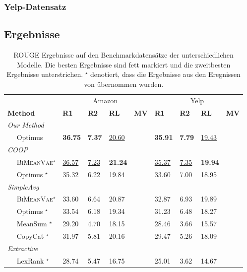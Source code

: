 \subsubsection{Yelp-Datensatz}

\subsection{Ergebnisse}

\begin{table}[!h]
    \label{eval_results}
    \centering
    \begin{tabular}{@{}lllllllll@{}}
    \toprule
                               & \multicolumn{4}{c}{Amazon} & \multicolumn{4}{c}{Yelp} \\ 
    \textbf{Method} & \textbf{R1} & \textbf{R2} & \textbf{RL} & \textbf{MV} & \textbf{R1} & \textbf{R2} & \textbf{RL} & \textbf{MV}\\ \midrule
    \textit{Our Method}        &         &         &        &        &        &   & &     \\
    $\quad$ Optimus            &     \textbf{36.75}    &   \textbf{7.37}      &     \underline{20.60}  & &   \textbf{35.91}   &   \textbf{7.79}       & \underline{19.43}   &    \\ \midrule
    \textit{COOP}              &         &         &        &        &        & &   &    \\
    $\quad$ \textsc{BiMeanVae}$^{\star}$ & \underline{36.57}    & \underline{7.23}   & \textbf{21.24} & & \underline{35.37}  & \underline{7.35}  & \textbf{19.94} & \\
    $\quad$ Optimus $^{\star}$           & 35.32   & 6.22    & 19.84 & & 33.60  & 7.00   & 18.95 & \\ \midrule
    \textit{SimpleAvg}         &         &         &        &      &  &        &        \\
    $\quad$ \textsc{BiMeanVae}$^{\star}$ & 33.60   & 6.64    & 20.87 & & 32.87  & 6.93   & 19.89 & \\
    $\quad$ Optimus  $^{\star}$          & 33.54   & 6.18    & 19.34 & & 31.23  & 6.48   & 18.27 & \\
    $\quad$ MeanSum  $^{\star}$          & 29.20   & 4.70    & 18.15 & & 28.46  & 3.66   & 15.57 & \\
    $\quad$ CopyCat  $^{\star}$          & 31.97   & 5.81    & 20.16 & & 29.47  & 5.26   & 18.09 & \\ \midrule
    \textit{Extractive}        &         &         &        &      &  &        &  &      \\
    $\quad$ LexRank  $^{\star}$          & 28.74   & 5.47    & 16.75 & & 25.01  & 3.62   & 14.67 & \\ \bottomrule
    \end{tabular}
    \caption{ROUGE Ergebnisse auf den Benchmarkdatensätze der unterschiedlichen Modelle. Die besten Ergebnisse sind fett markiert und die zweitbesten Ergebnisse unterstrichen.
    $^{\star}$ denotiert, dass die Ergebnisse aus den Eregnissen von \citep{coop} übernommen wurden.}
\end{table}

\pagebreak
